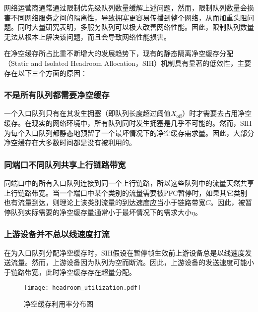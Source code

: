 网络运营商通常通过限制优先级队列数量缓解上述问题\cite{SIGCOMM16RDMA}，然而，限制队列数量会损害不同网络服务之间的隔离性，导致拥塞更容易传播到整个网络，从而加重头阻问题。同时大量研究\cite{SIGCOMM18Homa,NSDI15PIAS,grosvenor2015queues,NSDI18AFQ,SIGCOMM18AuTO}表明，多服务队列可以极大改善网络性能。因此，限制队列数量无法从根本上解决该问题，而且会导致网络性能损害。


在净空缓存所占比重不断增大的发展趋势下，现有的静态隔离净空缓存分配（Static and Isolated Headroom Allocation，SIH）机制具有显著的低效性，主要存在以下三个方面的原因：

\subsubsection{不是所有队列都需要净空缓存}

一个入口队列只有在其发生拥塞（即队列长度超过阈值$X_{\text{off}}$）时才需要去占用净空缓存。在现实的网络环境中，所有队列同时发生拥塞是几乎不可能的\cite{bai2023empowering}。然而，SIH为每个入口队列都静态地预留了一个最坏情况下的净空缓存需求量。因此，大部分净空缓存在大多数时间都是没有被利用的。

\subsubsection{同端口不同队列共享上行链路带宽}

同端口中的所有入口队列连接到同一个上行链路，所以这些队列中的流量天然共享上行链路带宽。当一个端口中某个类别的流量需要被PFC暂停时，如果其它类别也有流量到达，则理论上该类别流量的到达速度应当小于链路带宽$C$。因此，被暂停队列实际需要的净空缓存量通常小于最坏情况下的需求大小$\eta$。

\subsubsection{上游设备并不总以线速度打流}

在为入口队列分配净空缓存时，SIH假设在暂停帧生效前上游设备总是以线速度发送流量。然而，上游设备因为队列为空而断流。因此，上游设备的发送速度可能小于链路带宽，此时净空缓存存在超量分配。

\begin{figure}[H]
  \centering
  \texttt{[image: headroom\_utilization.pdf]}
  \caption{净空缓存利用率分布图}
  \label{c3:s2:ss1:fig:headroom utilization}
\end{figure}

